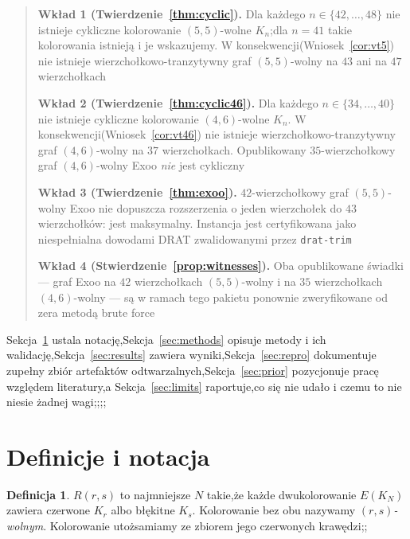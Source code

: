 \documentclass[11pt]{article}
\theoremstyle{definition}
\newtheorem{definition}[theorem]{Definicja}
\theoremstyle{plain}
\newcommand{\K}{\ensuremath{K}}
\begin{document}
\begin{quote}
\textbf{Wkład 1 (Twierdzenie~\ref{thm:cyclic}).} Dla każdego $n \in \{42,\dots,48\}$ nie istnieje cykliczne kolorowanie $(5,5)$-wolne $\K_n$;dla $n = 41$ takie kolorowania istnieją i je wskazujemy. W konsekwencji(Wniosek~\ref{cor:vt5}) nie istnieje wierzchołkowo-tranzytywny graf $(5,5)$-wolny na $43$ ani na $47$ wierzchołkach



\textbf{Wkład 2 (Twierdzenie~\ref{thm:cyclic46}).} Dla każdego $n \in \{34,\dots,40\}$ nie istnieje cykliczne kolorowanie $(4,6)$-wolne $\K_n$. W konsekwencji(Wniosek~\ref{cor:vt46}) nie istnieje wierzchołkowo-tranzytywny graf $(4,6)$-wolny na $37$ wierzchołkach. Opublikowany $35$-wierzchołkowy graf $(4,6)$-wolny Exoo \emph{nie} jest cykliczny



\textbf{Wkład 3 (Twierdzenie~\ref{thm:exoo}).} $42$-wierzchołkowy graf $(5,5)$-wolny Exoo nie dopuszcza rozszerzenia o jeden wierzchołek do $43$ wierzchołków: jest maksymalny. Instancja jest certyfikowana jako niespełnialna dowodami DRAT zwalidowanymi przez \texttt{drat-trim}



\textbf{Wkład 4 (Stwierdzenie~\ref{prop:witnesses}).} Oba opublikowane świadki --- graf Exoo na $42$ wierzchołkach $(5,5)$-wolny i na $35$ wierzchołkach $(4,6)$-wolny --- są w ramach tego pakietu ponownie zweryfikowane od zera metodą brute force\end{quote}



Sekcja~\ref{sec:defs} ustala notację,Sekcja~\ref{sec:methods} opisuje metody i ich walidację,Sekcja~\ref{sec:results} zawiera wyniki,Sekcja~\ref{sec:repro} dokumentuje zupełny zbiór artefaktów odtwarzalnych,Sekcja~\ref{sec:prior} pozycjonuje pracę względem literatury,a Sekcja~\ref{sec:limits} raportuje,co się nie udało i czemu to nie niesie żadnej wagi;;;;



\section{Definicje i notacja}\label{sec:defs}



\begin{definition}
$R(r,s)$ to najmniejsze $N$ takie,że każde dwukolorowanie $E(\K_N)$ zawiera czerwone $\K_r$ albo błękitne $\K_s$. Kolorowanie bez obu nazywamy \emph{$(r,s)$-wolnym}. Kolorowanie utożsamiamy ze zbiorem jego czerwonych krawędzi;;\end{definition}
\end{document}
